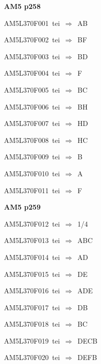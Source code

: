 \par\vfill\eject
{\bf\hfill AM5 p258\hfill\hbox{}}\par\bigskip
{\sixrm AM5L370F001\ {\sixit tei}\ }$\Rightarrow$\ AB\par\smallskip
{\sixrm AM5L370F002\ {\sixit tei}\ }$\Rightarrow$\ BF\par\smallskip
{\sixrm AM5L370F003\ {\sixit tei}\ }$\Rightarrow$\ BD\par\smallskip
{\sixrm AM5L370F004\ {\sixit tei}\ }$\Rightarrow$\ F\par\smallskip
{\sixrm AM5L370F005\ {\sixit tei}\ }$\Rightarrow$\ BC\par\smallskip
{\sixrm AM5L370F006\ {\sixit tei}\ }$\Rightarrow$\ BH\par\smallskip
{\sixrm AM5L370F007\ {\sixit tei}\ }$\Rightarrow$\ HD\par\smallskip
{\sixrm AM5L370F008\ {\sixit tei}\ }$\Rightarrow$\ HC\par\smallskip
{\sixrm AM5L370F009\ {\sixit tei}\ }$\Rightarrow$\ B\par\smallskip
{\sixrm AM5L370F010\ {\sixit tei}\ }$\Rightarrow$\ A\par\smallskip
{\sixrm AM5L370F011\ {\sixit tei}\ }$\Rightarrow$\ F\par\smallskip

\par\vfill\eject
{\bf\hfill AM5 p259\hfill\hbox{}}\par\bigskip
{\sixrm AM5L370F012\ {\sixit tei}\ }$\Rightarrow$\ 1/4\par\smallskip
{\sixrm AM5L370F013\ {\sixit tei}\ }$\Rightarrow$\ ABC\par\smallskip
{\sixrm AM5L370F014\ {\sixit tei}\ }$\Rightarrow$\ AD\par\smallskip
{\sixrm AM5L370F015\ {\sixit tei}\ }$\Rightarrow$\ DE\par\smallskip
{\sixrm AM5L370F016\ {\sixit tei}\ }$\Rightarrow$\ ADE\par\smallskip
{\sixrm AM5L370F017\ {\sixit tei}\ }$\Rightarrow$\ DB\par\smallskip
{\sixrm AM5L370F018\ {\sixit tei}\ }$\Rightarrow$\ BC\par\smallskip
{\sixrm AM5L370F019\ {\sixit tei}\ }$\Rightarrow$\ DECB\par\smallskip
{\sixrm AM5L370F020\ {\sixit tei}\ }$\Rightarrow$\ DEFB\par\smallskip

